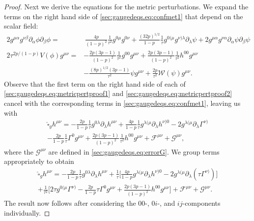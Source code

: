 \documentclass{article}
\newcommand{\mc}{\mathcal}
\newcommand{\wh}{\widehat}
\newcommand{\pa}{\partial}
\begin{document}
\begin{proof}
    Next we derive the equations for the metric perturbations. We expand the terms on the right hand side of \eqref{sec:gaugedeqs.eq:confmet1} that depend on the scalar field:
    \begin{subequations}
        \begin{align}
            2g^{\mu\alpha}g^{\nu\beta}\pa_\alpha \phi \pa_\beta \phi =&\> \frac{4p}{(1-p)^2}\frac{1}{\tau^2}g^{0\mu}g^{0\nu} + \frac{(32p)^{1/2}}{1-p}\frac{1}{\tau}g^{0(\mu}g^{\nu)\lambda}\pa_\lambda \psi +2 g^{\mu\alpha}g^{\nu\alpha}\pa_\alpha \psi\pa_\beta \psi\label{sec:gaugedeqs.eq:metricpertproof1}\\
            2\tau^{2p/(1-p)}V(\phi)g^{\mu\nu}=& -\frac{2p(3p-1)}{(1-p)^2}\frac{1}{\tau^2}g^{00}g^{\mu\nu} + \frac{2p(3p-1)}{(1-p)^2}\frac{1}{\tau^2} h^{00}g^{\mu\nu}\nonumber\\
            &- \frac{(8p)^{1/2}(3p-1)}{\tau^2}\psi g^{\mu\nu} + \frac{2p}{\tau^2}\mc{W}(\psi)g^{\mu\nu}.\label{sec:gaugedeqs.eq:metricpertproof2}
        \end{align}
    \end{subequations}
    Observe that the first term on the right hand side of each of \eqref{sec:gaugedeqs.eq:metricpertproof1} and \eqref{sec:gaugedeqs.eq:metricpertproof2} cancel with the corresponding terms in \eqref{sec:gaugedeqs.eq:confmet1}, leaving us with
    \begin{multline}
        \wh{\square}_g  h^{\mu\nu} = -\frac{2p}{1-p}\frac{1}{\tau}g^{0\lambda}\pa_\lambda  h^{\mu\nu} + \frac{4p}{1-p}\frac{1}{\tau}g^{\lambda(\mu}\pa_\lambda  h^{\nu)0} - 2g^{\lambda(\mu}\pa_\lambda \Gamma^{\nu)}\\
        -\frac{2p}{1-p}\frac{1}{\tau}\Gamma^0g^{\mu\nu} + \frac{2p(3p-1)}{(1-p)^2}\frac{1}{\tau^2} h^{00}g^{\mu\nu}+ \mc{F}^{\mu\nu}+\mc{G}^{\mu\nu},
    \end{multline}
    where the $\mc{G}^{\mu\nu}$ are defined in \eqref{sec:gaugedeqs.eq:errorG}. We group terms appropriately to obtain
    \begin{multline}
        \wh{\square}_g  h^{\mu\nu} = -\frac{2p}{1-p}\frac{1}{\tau}g^{0\lambda}\pa_\lambda  h^{\mu\nu} + \frac{1}{\tau}\Big[\frac{4p}{1-p}g^{\lambda(\mu}\pa_\lambda  h^{\nu)0} - 2 g^{\lambda(\mu}\pa_\lambda(\tau \Gamma^{\nu)})\Big]\\
        +\frac{1}{\tau^2}\Big[2\tau g^{0(\mu}\Gamma^{\nu)}-\frac{2p}{1-p}\tau\Gamma^0g^{\mu\nu} + \frac{2p(3p-1)}{(1-p)^2} h^{00}g^{\mu\nu}\Big]+ \mc{F}^{\mu\nu}+\mc{G}^{\mu\nu}.
    \end{multline}
    The result now follows after considering the $00$-, $0i$-, and $ij$-components individually.
\end{proof}
\end{document}
